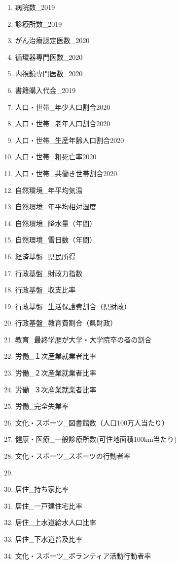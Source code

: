\begin{multicols}{2}
\begin{enumerate}
  \item  病院数\_2019
  \item  診療所数\_2019
  \item  がん治療認定医数\_2020
  \item  循環器専門医数\_2020
  \item  内視鏡専門医数\_2020
  \item  書籍購入代金\_2019
  \item  人口・世帯\_年少人口割合2020
  \item  人口・世帯\_老年人口割合2020
  \item  人口・世帯\_生産年齢人口割合2020
  \item  人口・世帯\_粗死亡率2020
  \item  人口・世帯\_共働き世帯割合2020
  \item  自然環境\_年平均気温
  \item  自然環境\_年平均相対湿度
  \item  自然環境\_降水量（年間）
  \item  自然環境\_雪日数（年間）
  \item  経済基盤\_県民所得
  \item  行政基盤\_財政力指数
  \item  行政基盤\_収支比率
  \item  行政基盤\_生活保護費割合（県財政）
  \item  行政基盤\_教育費割合（県財政）
  \item  教育\_最終学歴が大学・大学院卒の者の割合
  \item  労働\_１次産業就業者比率
  \item  労働\_２次産業就業者比率
  \item  労働\_３次産業就業者比率
  \item  労働\_完全失業率
  \item  文化・スポーツ\_図書館数（人口100万人当たり）
  \item  健康・医療\_一般診療所数(可住地面積100km当たり)
  \item  文化・スポーツ\_スポーツの行動者率
  \item
  \item  居住\_持ち家比率
  \item  居住\_一戸建住宅比率
  \item  居住\_上水道給水人口比率
  \item  居住\_下水道普及比率
  \item  文化・スポーツ\_ボランティア活動行動者率

\end{enumerate}
\end{multicols}
